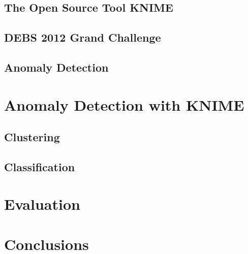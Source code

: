 \documentclass{dima}
\begin{document}
\subsection{The Open Source Tool KNIME}

\subsection{DEBS 2012 Grand Challenge}

\subsection{Anomaly Detection}

\section{Anomaly Detection with KNIME}
\subsection{Clustering}
\subsection{Classification}

\section{Evaluation}

\section{Conclusions}



\end{document}
